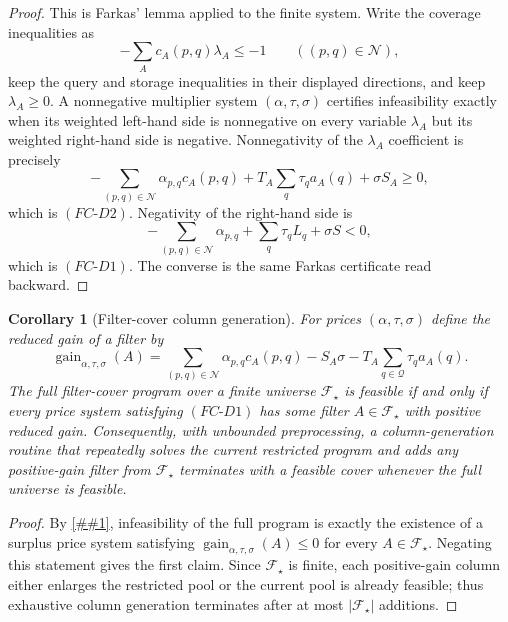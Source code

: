 \documentclass[10pt]{article}
\newcommand{\cref}[1]{\ref{##1}}
\newtheorem{corollary}[theorem]{Corollary}
\theoremstyle{definition}
\begin{document}
\begin{proof}
   This is Farkas' lemma applied to the finite system.  Write the coverage
   inequalities as
   \[
      -\sum_A c_A(p,q)\lambda_A\le -1
      \qquad ((p,q)\in\mathcal N),
   \]
   keep the query and storage inequalities in their displayed directions, and
   keep $\lambda_A\ge0$.  A nonnegative multiplier system
   $(\alpha,\tau,\sigma)$ certifies infeasibility exactly when its weighted
   left-hand side is nonnegative on every variable $\lambda_A$ but its weighted
   right-hand side is negative.  Nonnegativity of the $\lambda_A$ coefficient is
   precisely
   \[
      -\sum_{(p,q)\in\mathcal N}\alpha_{p,q}c_A(p,q)
      +T_A\sum_q\tau_qa_A(q)+\sigma S_A\ge0,
   \]
   which is \((FC\text{-}D2)\).  Negativity of the right-hand side is
   \[
      -\sum_{(p,q)\in\mathcal N}\alpha_{p,q}
      +\sum_q\tau_qL_q+\sigma S<0,
   \]
   which is \((FC\text{-}D1)\).  The converse is the same Farkas certificate read
   backward.
\end{proof}

\begin{corollary}[Filter-cover column generation]
   \label{cor:filter-cover-column-generation}
   For prices $(\alpha,\tau,\sigma)$ define the reduced gain of a filter by
   \[
      \operatorname{gain}_{\alpha,\tau,\sigma}(A)
      =
      \sum_{(p,q)\in\mathcal N}\alpha_{p,q}c_A(p,q)
      -
      S_A\sigma
      -
      T_A\sum_{q\in\mathcal Q}\tau_qa_A(q).
   \]
   The full filter-cover program over a finite universe $\mathcal F_\star$ is
   feasible if and only if every price system satisfying \((FC\text{-}D1)\) has
   some filter $A\in\mathcal F_\star$ with positive reduced gain.  Consequently,
   with unbounded preprocessing, a column-generation routine that repeatedly
   solves the current restricted program and adds any positive-gain filter from
   $\mathcal F_\star$ terminates with a feasible cover whenever the full universe
   is feasible.
\end{corollary}

\begin{proof}
   By \cref{lem:finite-filter-cover-dual}, infeasibility of the full program is
   exactly the existence of a surplus price system satisfying
   \(\operatorname{gain}_{\alpha,\tau,\sigma}(A)\le0\) for every
   $A\in\mathcal F_\star$.  Negating this statement gives the first claim.
   Since $\mathcal F_\star$ is finite, each positive-gain column either enlarges
   the restricted pool or the current pool is already feasible; thus exhaustive
   column generation terminates after at most $|\mathcal F_\star|$ additions.
\end{proof}
\end{document}
